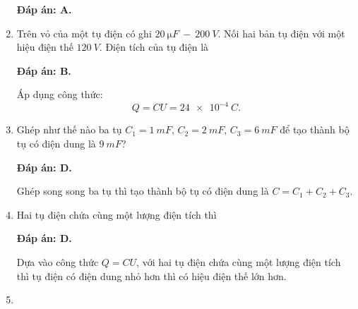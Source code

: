 \begin{enumerate}[label=\bfseries Câu \arabic*:]
{	}
	\loigiai
	{	\textbf{Đáp án: A.}
		
	}
	\item {}
	
	\cauhoi
	{Trên vỏ của một tụ điện có ghi $\SI{20}{\micro F}\ -\ \SI{200}{V}$. Nối hai bản tụ điện với một hiệu điện thế $\SI{120}{V}$. Điện tích của tụ điện là
		
	}
	\loigiai
	{	\textbf{Đáp án: B.}
		
		Áp dụng công thức:
		$$Q=CU=\SI{24e-4}{C}.$$
	}
	\item {}
	
	\cauhoi
	{Ghép như thế nào ba tụ $C_1=\SI{1}{mF}$, $C_2=\SI{2}{mF}$, $C_3=\SI{6}{mF}$ để tạo thành bộ tụ có điện dung là $\SI{9}{mF}$?
		
	}
	\loigiai
	{	\textbf{Đáp án: D.}
		
		Ghép song song ba tụ thì tạo thành bộ tụ có điện dung là $C=C_1+C_2+C_3$.
	}
	\item {}
	
	\cauhoi
	{Hai tụ điện chứa cùng một lượng điện tích thì
		
	}
	\loigiai
	{	\textbf{Đáp án: D.}
		
		Dựa vào công thức $Q=CU$, với hai tụ điện chứa cùng một lượng điện tích thì tụ điện có điện dung nhỏ hơn thì có hiệu điện thế lớn hơn.
	}
	\item {}
	

\end{enumerate}
